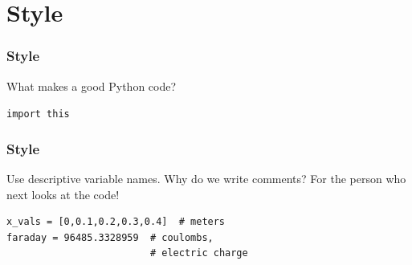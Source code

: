 \documentclass[11pt]{beamer}
\begin{document}



\section{Style}

\begin{frame}[fragile]
  \frametitle{Style}
  \Enlarge

  \begin{enumerate}
  \myitem  What makes a good Python code? %
  \end{enumerate}
  \begin{center}
    \textcolor{CS101Base}{\Huge \texttt{import this}}
  \end{center}
\end{frame}


\begin{frame}[fragile]
  \frametitle{Style}
  \Enlarge

  \begin{enumerate}
  \myitem  Use descriptive variable names. %
  \myitem  Why do we write comments? %
  \myitem  For the person who next looks at the code!
  \begin{Verbatim}
x_vals = [0,0.1,0.2,0.3,0.4]  # meters
faraday = 96485.3328959  # coulombs,
                         # electric charge
  \end{Verbatim}
  \end{enumerate}
\end{frame}

\end{document}
